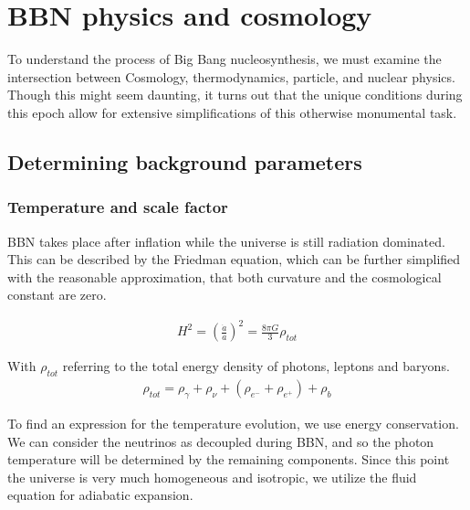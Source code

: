 
\chapter{BBN physics and cosmology}
\label{chap:theory}

To understand the process of Big Bang nucleosynthesis, we must examine the intersection between Cosmology, thermodynamics, particle, and nuclear physics. Though this might seem daunting, it turns out that the unique conditions during this epoch allow for extensive simplifications of this otherwise monumental task.



\section{Determining background parameters}
\label{sec:Background}

\subsection{Temperature and scale factor}
\label{ssec:cosmology}

BBN takes place after inflation while the universe is still radiation dominated. This can be described by the Friedman equation, which can be further simplified with the reasonable approximation, that both curvature and the cosmological constant are zero. 

\begin{align}
    H^2=\left(\frac{\dot{a}}{a}\right)^2=\frac{8\pi G}{3}\rho_{tot}
\end{align}

With $\rho_{tot}$ referring to the total energy density of photons, leptons and baryons.
\begin{align}
    \rho_{tot}=\rho_{\gamma}+\rho_{\nu}+(\rho_{e^-}+\rho_{e^+})+\rho_{b}
\end{align}

To find an expression for the temperature evolution, we use energy conservation. We can consider the neutrinos as decoupled during BBN, and so the photon temperature will be determined by the remaining components. Since this point the universe is very much homogeneous and isotropic, we utilize the fluid equation for adiabatic expansion. 

